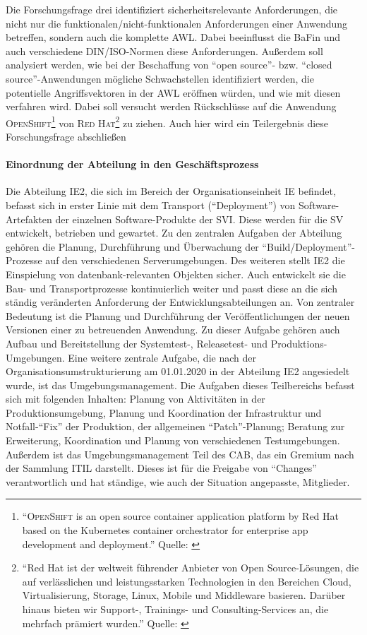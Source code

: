 Die Forschungsfrage drei identifiziert sicherheitsrelevante Anforderungen, die nicht nur die funktionalen/nicht-funktionalen Anforderungen einer Anwendung betreffen, sondern auch die komplette \ac{AWL}. Dabei beeinflusst die \ac{BaFin} und auch verschiedene \textsc{DIN/ISO}-Normen diese Anforderungen. Außerdem soll analysiert werden, wie bei der Beschaffung von \enquote{open source}- bzw. \enquote{closed source}-Anwendungen mögliche Schwachstellen identifiziert werden, die potentielle Angriffsvektoren in der \ac{AWL} eröffnen würden, und wie mit diesen verfahren wird. Dabei soll versucht werden Rückschlüsse auf die Anwendung \textsc{OpenShift\footnote{\enquote{\textsc{OpenShift} is an open source container application platform by Red Hat based on the Kubernetes container orchestrator for enterprise app development and deployment.} Quelle: \cite[][]{red_hat_inc_openshift_2020}}} von \textsc{Red Hat\footnote{\enquote{Red Hat ist der weltweit führender Anbieter von Open Source-Lösungen, die auf verlässlichen und leistungsstarken Technologien in den Bereichen Cloud, Virtualisierung, Storage, Linux, Mobile und Middleware basieren. Darüber hinaus bieten wir Support-, Trainings- und Consulting-Services an, die mehrfach prämiert wurden.} Quelle: \cite[][]{red_hat_inc_red_2020}}} zu ziehen. Auch hier wird ein Teilergebnis diese Forschungsfrage abschließen


\paragraph{Einordnung der Abteilung in den Geschäftsprozess}
Die Abteilung \ac{IE2}, die sich im Bereich der Organisationseinheit \ac{IE} befindet, befasst sich in erster Linie mit dem Transport (\enquote{Deployment}) von Software-Artefakten der einzelnen Software-Produkte der \ac{SVI}. Diese werden für die \ac{SV} entwickelt, betrieben und gewartet. Zu den zentralen Aufgaben der Abteilung gehören die Planung, Durchführung und Überwachung der \enquote{Build/Deployment}-Prozesse auf den verschiedenen Serverumgebungen. Des weiteren stellt \ac{IE2} die Einspielung von datenbank-relevanten Objekten sicher. Auch entwickelt sie die Bau- und Transportprozesse kontinuierlich weiter und passt diese an die sich ständig veränderten Anforderung der Entwicklungsabteilungen an. Von zentraler Bedeutung ist die Planung und Durchführung der Veröffentlichungen der neuen Versionen einer zu betreuenden Anwendung. Zu dieser Aufgabe gehören auch Aufbau und Bereitstellung der Systemtest-, Releasetest- und Produktions-Umgebungen. Eine weitere zentrale Aufgabe, die nach der Organisationsumstrukturierung am 01.01.2020 in der Abteilung \ac{IE2} angesiedelt wurde, ist das Umgebungsmanagement. Die Aufgaben dieses Teilbereichs befasst sich mit folgenden Inhalten: Planung von Aktivitäten in der Produktionsumgebung, Planung und Koordination der Infrastruktur und Notfall-\enquote{Fix} der Produktion, der allgemeinen \enquote{Patch}-Planung; Beratung zur Erweiterung, Koordination und Planung von verschiedenen Testumgebungen. Außerdem ist das Umgebungsmanagement Teil des \ac{CAB}, das ein Gremium nach der Sammlung \ac{ITIL} darstellt. Dieses ist für die Freigabe von \enquote{Changes} verantwortlich und hat ständige, wie auch der Situation angepasste, Mitglieder. 


